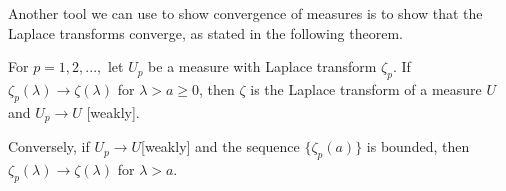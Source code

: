 
Another tool we can use to show convergence of measures is to show that the Laplace transforms converge, as stated in the following theorem.
\begin{thm}\label{thm: ext cont thm}
	For \(p=1,2,...,\) let \(U_p\) be a measure with Laplace transform \(\zeta_p\). If \(\zeta_p(\lambda)\to\zeta(\lambda)\) for \(\lambda > a\geq 0\), then \(\zeta\) is the Laplace transform of a measure \(U\) and \(U_p\to U\) [weakly].
	
	Conversely, if \(U_p\to U\)[weakly] and the sequence \(\{\zeta_p(a)\}\) is bounded, then \(\zeta_p(\lambda)\to\zeta(\lambda)\) for \(\lambda >a\). 
\end{thm}

